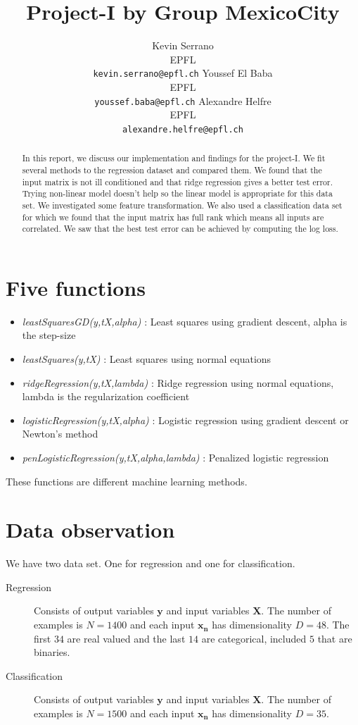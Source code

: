 \documentclass{article} %
\title{Project-I by Group MexicoCity}
\author{
Kevin Serrano\\EPFL\\
\texttt{kevin.serrano@epfl.ch} \And Youssef El Baba\\EPFL\\
\texttt{youssef.baba@epfl.ch} \And Alexandre Helfre\\EPFL\\
\texttt{alexandre.helfre@epfl.ch}
}
\begin{document}
\maketitle

\begin{abstract}
In this report, we discuss our implementation and findings for the project-I. We fit several methods to the regression dataset and compared them. We found that the input matrix is not ill conditioned and that ridge regression gives a better test error. Trying non-linear model doesn't help so the linear model is appropriate for this data set. We investigated some feature transformation. We also used a classification data set for which we found that the input matrix has full rank which means all inputs are correlated. We saw that the best test error can be achieved by computing the log loss.


\end{abstract}
\section{Five functions}
\begin{itemize}
\item \textit{leastSquaresGD(y,tX,alpha)} : Least squares using gradient descent, alpha is the step-size
\item \textit{leastSquares(y,tX)} : Least squares using normal equations
\item \textit{ridgeRegression(y,tX,lambda)} : Ridge regression using normal equations, lambda is the regularization coefficient
\item \textit{logisticRegression(y,tX,alpha)} : Logistic regression using gradient descent or Newton's method
\item \textit{penLogisticRegression(y,tX,alpha,lambda)} : Penalized logistic regression 

\end{itemize}
These functions are different machine learning methods.


\section{Data observation}
\label{sec:datadescr}
We have two data set. One for regression and one for classification. \begin{description}
\item[Regression] Consists of output variables $\mathbf{y}$ and input variables $\mathbf{X}$. The number of examples is $N = 1400$ and each input $\mathbf{x_n}$ has dimensionality $D = 48$. The first $34$ are real valued and the last $14$ are categorical, included $5$ that are binaries.
\item[Classification] Consists of output variables $\mathbf{y}$ and input variables $\mathbf{X}$. The number of examples is $N = 1500$ and each input $\mathbf{x_n}$ has dimensionality $D = 35$. 

\end{description}
\end{document}
